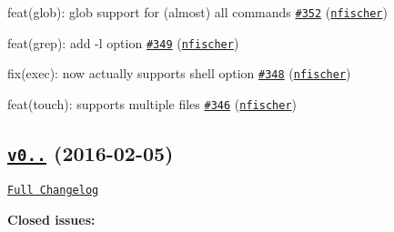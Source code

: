 \begin{DoxyItemize}
\item feat(glob)\+: glob support for (almost) all commands \href{https://github.com/shelljs/shelljs/pull/352}{\tt \#352} (\href{https://github.com/nfischer}{\tt nfischer})
\item feat(grep)\+: add -\/l option \href{https://github.com/shelljs/shelljs/pull/349}{\tt \#349} (\href{https://github.com/nfischer}{\tt nfischer})
\item fix(exec)\+: now actually supports shell option \href{https://github.com/shelljs/shelljs/pull/348}{\tt \#348} (\href{https://github.com/nfischer}{\tt nfischer})
\item feat(touch)\+: supports multiple files \href{https://github.com/shelljs/shelljs/pull/346}{\tt \#346} (\href{https://github.com/nfischer}{\tt nfischer})
\end{DoxyItemize}

\subsection*{\href{https://github.com/shelljs/shelljs/tree/v0.6.0}{\tt v0..} (2016-\/02-\/05)}

\href{https://github.com/shelljs/shelljs/compare/v0.5.3...v0.6.0}{\tt Full Changelog}

{\bfseries Closed issues\+:}


